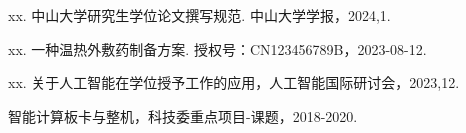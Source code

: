 
\begin{achievements}

\begin{theachievements}[已发表论文]
  \item xx. 中山大学研究生学位论文撰写规范. 中山大学学报，2024,1.
\end{theachievements}

\begin{theachievements}[发明专利]
  \item xx. 一种温热外敷药制备方案. 授权号：CN123456789B，2023-08-12.
\end{theachievements}

\begin{theachievements}[会议论文]
  \item xx. 关于人工智能在学位授予工作的应用，人工智能国际研讨会，2023,12.
\end{theachievements}

\begin{theachievements}[参与的科研项目]
  \item 智能计算板卡与整机，科技委重点项目-课题，2018-2020.
\end{theachievements}

\end{achievements}
